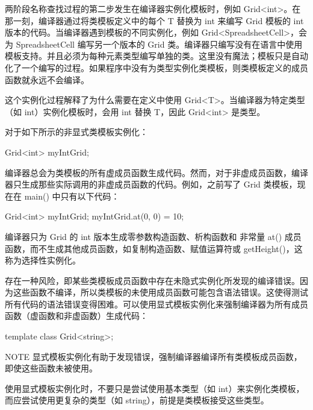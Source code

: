 两阶段名称查找过程的第二步发生在编译器实例化模板时，例如 Grid<int>。在那一刻，编译器通过将类模板定义中的每个 T 替换为 int 来编写 Grid 模板的 int 版本的代码。当编译器遇到模板的不同实例化，例如 Grid<SpreadsheetCell>，会为 SpreadsheetCell 编写另一个版本的 Grid 类。编译器只编写没有在语言中使用模板支持。并且必须为每种元素类型编写单独的类。这里没有魔法；模板只是自动化了一个编写的过程。如果程序中没有为类型实例化类模板，则类模板定义的成员函数就永远不会编译。

这个实例化过程解释了为什么需要在定义中使用 Grid<T>。当编译器为特定类型（如 int）实例化模板时，会用 int 替换 T，因此 Grid<int> 是类型。


对于如下所示的非显式类模板实例化：

\begin{cpp}
Grid<int> myIntGrid;
\end{cpp}

编译器总会为类模板的所有虚成员函数生成代码。然而，对于非虚成员函数，编译器只生成那些实际调用的非虚成员函数的代码。例如，之前写了 Grid 类模板，现在在 main() 中只有以下代码：

\begin{cpp}
Grid<int> myIntGrid;
myIntGrid.at(0, 0) = 10;
\end{cpp}

编译器只为 Grid 的 int 版本生成零参数构造函数、析构函数和 非常量 at() 成员函数，而不生成其他成员函数，如复制构造函数、赋值运算符或 getHeight()，这称为选择性实例化。


存在一种风险，即某些类模板成员函数中存在未隐式实例化所发现的编译错误。因为这些函数不编译，所以类模板的未使用成员函数可能包含语法错误。这使得测试所有代码的语法错误变得困难。可以使用显式模板实例化来强制编译器为所有成员函数（虚函数和非虚函数）生成代码：

\begin{cpp}
template class Grid<string>;
\end{cpp}

\begin{myNotic}{NOTE}
显式模板实例化有助于发现错误，强制编译器编译所有类模板成员函数，即使这些函数未被使用。
\end{myNotic}

使用显式模板实例化时，不要只是尝试使用基本类型（如 int）来实例化类模板，而应尝试使用更复杂的类型（如 string），前提是类模板接受这些类型。


